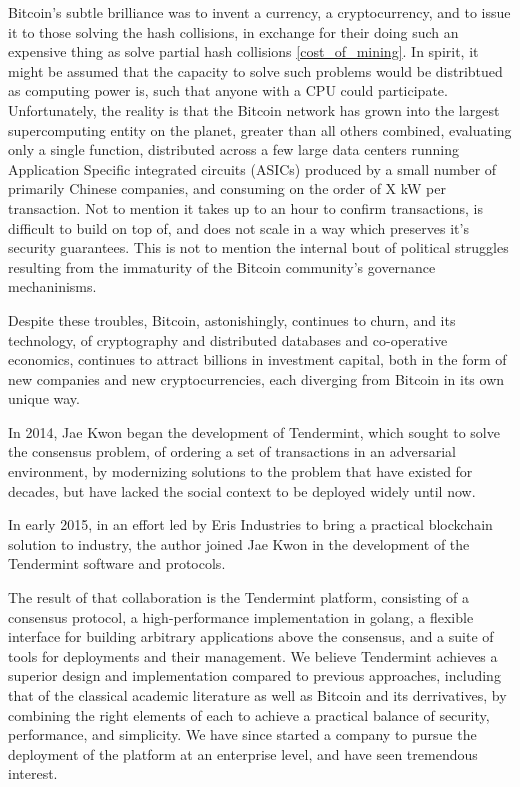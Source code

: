 Bitcoin's subtle brilliance was to invent a currency, a cryptocurrency, and to issue it to those solving the hash collisions, 
in exchange for their doing such an expensive thing as solve partial hash collisions \ref{cost_of_mining}.
In spirit, it might be assumed that the capacity to solve such problems would be distribtued as computing power is, 
such that anyone with a CPU could participate.
Unfortunately, the reality is that the Bitcoin network has grown into the largest supercomputing entity on the planet, greater than all others combined,
evaluating only a single function, distributed across a few large data centers running Application Specific integrated circuits (ASICs) produced by a small number of primarily Chinese companies, and consuming on the order of X kW per transaction.
Not to mention it takes up to an hour to confirm transactions, is difficult to build on top of, and does not scale in a way which preserves it's security guarantees.
This is not to mention the internal bout of political struggles resulting from the immaturity of the Bitcoin community's governance mechaninisms.

Despite these troubles, Bitcoin, astonishingly, continues to churn,
and its technology, 
of cryptography and distributed databases and co-operative economics,
continues to attract billions in investment capital,
both in the form of new companies and new cryptocurrencies,
each diverging from Bitcoin in its own unique way.

In 2014, Jae Kwon began the development of Tendermint, which sought to solve the consensus problem,
of ordering a set of transactions in an adversarial environment, 
by modernizing solutions to the problem that have existed for decades,
but have lacked the social context to be deployed widely until now.

In early 2015, in an effort led by Eris Industries to bring a practical blockchain solution to industry,
the author joined Jae Kwon in the development of the Tendermint software and protocols.

The result of that collaboration is the Tendermint platform, consisting of a consensus protocol, a high-performance implementation in golang, 
a flexible interface for building arbitrary applications above the consensus, and a suite of tools for deployments and their management.
We believe Tendermint achieves a superior design and implementation compared to previous approaches, 
including that of the classical academic literature as well as Bitcoin and its derrivatives,
by combining the right elements of each to achieve a practical balance of security, performance, and simplicity.
We have since started a company to pursue the deployment of the platform at an enterprise level, and have seen tremendous interest.

